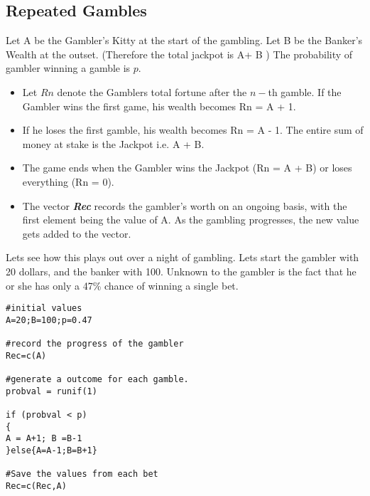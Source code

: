 \documentclass[11pt]{article} %
\begin{document}
\subsection{Repeated Gambles}
Let A be the Gambler's Kitty at the start of the gambling. Let B be the Banker's Wealth at the outset. (Therefore the total jackpot is A+ B )
The probability of gambler winning a gamble is $p$.

\begin{itemize}
\item Let $Rn$ denote the Gamblers total fortune after the $n-$th gamble. If the Gambler wins the first game, his wealth becomes Rn = A + 1. 
\item If he loses the first gamble, his wealth becomes Rn = A - 1. The entire sum of money at stake is the Jackpot i.e. A + B. 
\item The game ends when the Gambler wins the Jackpot (Rn = A + B) or loses everything (Rn = 0).
\item The vector \textbf{\textit{Rec}} records the gambler's worth on an ongoing basis, with the first element being the value of A. As the gambling progresses, the new value gets added to the vector.
\end{itemize}

Lets see how this plays out over a night of gambling. Lets start the gambler with 20 dollars, and the banker with 100. Unknown to the gambler is the fact that he or she has only a 47\% chance of winning a single bet.
\begin{framed}
\begin{verbatim}
#initial values
A=20;B=100;p=0.47

#record the progress of the gambler
Rec=c(A)

#generate a outcome for each gamble.
probval = runif(1)

if (probval < p)
{
A = A+1; B =B-1
}else{A=A-1;B=B+1}

#Save the values from each bet
Rec=c(Rec,A)
\end{verbatim}
\end{framed}
\newpage
\end{document}
